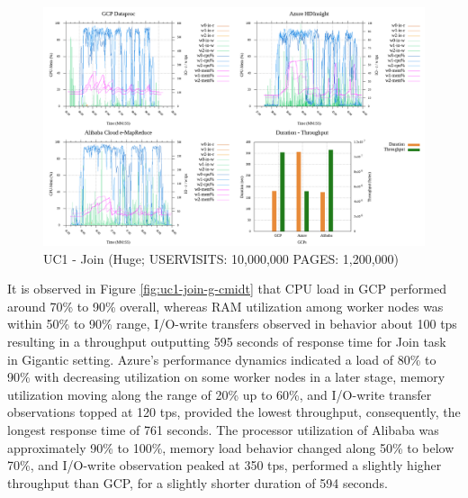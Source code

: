 \documentclass[review]{elsarticle}
\begin{document}
	
	\begin{figure}[p]
		\caption{UC1 - Join (Huge; USERVISITS: 10,000,000 PAGES: 1,200,000)}
		\label{fig:uc1-join-h-cmidt}
		\includegraphics[width=\textwidth]{uc1-join-h-cmidt}
		\centering
	\end{figure}
	
	It is observed in Figure \ref{fig:uc1-join-g-cmidt} that CPU load in GCP performed around 70\% to 90\% overall, whereas RAM utilization among worker nodes was within 50\% to 90\% range, I/O-write transfers observed in behavior about 100 tps resulting in a throughput outputting 595 seconds of response time for Join task in Gigantic setting. Azure's performance dynamics indicated a load of 80\% to 90\% with decreasing utilization on some worker nodes in a later stage, memory utilization moving along the range of 20\% up to 60\%, and I/O-write transfer observations topped at 120 tps, provided the lowest throughput, consequently, the longest response time of 761 seconds.  The processor utilization of Alibaba was approximately 90\% to 100\%, memory load behavior changed along 50\% to below 70\%, and I/O-write observation peaked at 350 tps, performed a slightly higher throughput than GCP, for a slightly shorter duration of 594 seconds.
	
\end{document}
